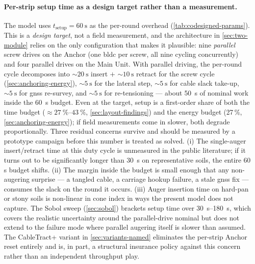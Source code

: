 \documentclass[11pt,a4paper]{article}
\begin{document}
\paragraph{Per-strip setup time as a design target rather than a measurement.} The model uses $t_{\text{setup}} = \SI{60}{\second}$ as the per-round overhead (\cref{tab:codesigned-params}). This is a \emph{design target}, not a field measurement, and the architecture in \cref{sec:two-module} relies on the only configuration that makes it plausible: nine \emph{parallel} screw drives on the Anchor (one \gls{bldc} per screw, all nine cycling concurrently) and four parallel drives on the Main Unit. With parallel driving, the per-round cycle decomposes into ${\sim}\SI{20}{\second}$ insert $+$ ${\sim}\SI{10}{\second}$ retract for the screw cycle (\cref{sec:anchoring-energy}), ${\sim}\SI{5}{\second}$ for the lateral step, ${\sim}\SI{5}{\second}$ for cable slack take-up, ${\sim}\SI{5}{\second}$ for \gls{gnss} re-survey, and ${\sim}\SI{5}{\second}$ for re-tensioning --- about \SI{50}{\second} of nominal work inside the \SI{60}{\second} budget. Even at the target, setup is a first-order share of both the time budget (${\approx}\SIrange{27}{43}{\percent}$, \cref{sec:layout-findings}) and the energy budget (27\,\%, \cref{sec:anchoring-energy}); if field measurements come in slower, both degrade proportionally. Three residual concerns survive and should be measured by a prototype campaign before this number is treated as solved. (i) The single-auger insert/retract time at this duty cycle is unmeasured in the public literature; if it turns out to be significantly longer than \SI{30}{\second} on representative soils, the entire 60 s budget shifts. (ii) The margin inside the budget is small enough that any non-augering surprise --- a tangled cable, a carriage hookup failure, a stale \gls{gnss} fix --- consumes the slack on the round it occurs. (iii) Auger insertion time on hard-pan or stony soils is non-linear in cone index in ways the present model does not capture. The Sobol sweep (\cref{sec:sobol}) brackets setup time over \SIrange{30}{180}{\second}, which covers the realistic uncertainty around the parallel-drive nominal but does not extend to the failure mode where parallel augering itself is slower than assumed. The CableTract+ variant in \cref{sec:variants-named} eliminates the per-strip Anchor reset entirely and is, in part, a structural insurance policy against this concern rather than an independent throughput play.
\end{document}
